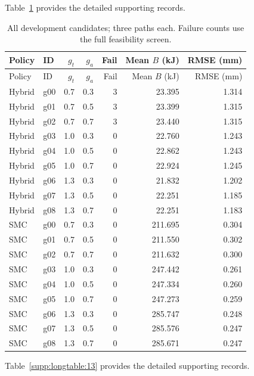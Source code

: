 \documentclass[11pt,a4paper]{article}
\begin{document}
\begingroup\hypersetup{hypertexnames=true}\small\setlength{\tabcolsep}{4pt}
Table~\ref{supp:longtable:12} provides the detailed supporting records.
\begin{longtable}{llrrrrr}
\caption{All development candidates; three paths each. Failure counts use the full feasibility screen.}\label{supp:longtable:12}\\\toprule
Policy & ID & $g_t$ & $g_a$ & Fail & Mean $B$ (kJ) & RMSE (mm)\\\midrule\endfirsthead
\toprule Policy & ID & $g_t$ & $g_a$ & Fail & Mean $B$ (kJ) & RMSE (mm)\\\midrule\endhead
Hybrid & g00 & 0.7 & 0.3 & 3 & 23.395 & 1.314 \\
Hybrid & g01 & 0.7 & 0.5 & 3 & 23.399 & 1.315 \\
Hybrid & g02 & 0.7 & 0.7 & 3 & 23.440 & 1.315 \\
Hybrid & g03 & 1.0 & 0.3 & 0 & 22.760 & 1.243 \\
Hybrid & g04 & 1.0 & 0.5 & 0 & 22.862 & 1.243 \\
Hybrid & g05 & 1.0 & 0.7 & 0 & 22.924 & 1.245 \\
Hybrid & g06 & 1.3 & 0.3 & 0 & 21.832 & 1.202 \\
Hybrid & g07 & 1.3 & 0.5 & 0 & 22.251 & 1.185 \\
Hybrid & g08 & 1.3 & 0.7 & 0 & 22.251 & 1.183 \\
SMC & g00 & 0.7 & 0.3 & 0 & 211.695 & 0.304 \\
SMC & g01 & 0.7 & 0.5 & 0 & 211.550 & 0.302 \\
SMC & g02 & 0.7 & 0.7 & 0 & 211.632 & 0.300 \\
SMC & g03 & 1.0 & 0.3 & 0 & 247.442 & 0.261 \\
SMC & g04 & 1.0 & 0.5 & 0 & 247.334 & 0.260 \\
SMC & g05 & 1.0 & 0.7 & 0 & 247.273 & 0.259 \\
SMC & g06 & 1.3 & 0.3 & 0 & 285.747 & 0.248 \\
SMC & g07 & 1.3 & 0.5 & 0 & 285.576 & 0.247 \\
SMC & g08 & 1.3 & 0.7 & 0 & 285.671 & 0.247 \\
\bottomrule\end{longtable}\endgroup
\begingroup\hypersetup{hypertexnames=true}\small\setlength{\tabcolsep}{4pt}
Table~\ref{supp:longtable:13} provides the detailed supporting records.
\end{document}
